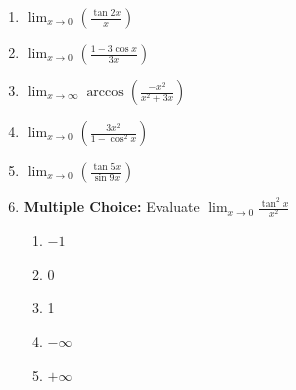 \documentclass[12pt]{article}
\newif\ifans
\begin{document}
\begin{enumerate}
\ifans{\fbox{2}} \fi

\item $\displaystyle \lim_{x\rightarrow 0}{\left(\frac{\tan 2x}{x}\right)}$

\ifans{\fbox{2}} \fi

\item $\displaystyle \lim_{x\rightarrow 0}{\left(\frac{1-3\cos{x}}{3x}\right)}$

\ifans{\fbox{DNE}} \fi

\item $\displaystyle \lim_{x\rightarrow \infty}{\arccos{\left(\frac{-x^2}{x^2+3x}\right)}}$ 

\ifans{\fbox{$\displaystyle \pi$}} \fi

\item $\displaystyle \lim_{x\rightarrow 0}{\left(\frac{3x^2}{1-\cos^2{x}}\right)}$

\ifans{\fbox{3}} \fi

\item $\displaystyle \lim_{x \rightarrow 0}{\left(\frac{\tan{5x}}{\sin{9x}}\right)}$

\ifans{\fbox{$\displaystyle \frac{5}{9}$}} \fi

\item {\bf Multiple Choice:} Evaluate $\lim_{x \rightarrow 0} \frac{\tan^2{x}}{x^2}$

\begin{enumerate}

\item $-1$

\item 0

\item 1

\item $-\infty$

\item $+\infty$

\end{enumerate}

\ifans{\fbox{c}} \fi

\end{enumerate}

\end{document}
